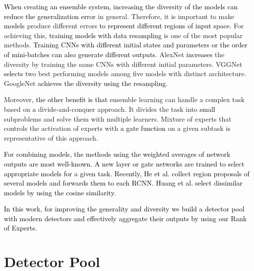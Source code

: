 \documentclass[10pt,twocolumn,letterpaper]{article}
\newcommand{\RE}{\textcolor{black}}
\newcommand{\RV}{\textcolor{black}}
\begin{document}
\RE{When creating an ensemble system,  increasing the diversity of the \RV{models}  can reduce the generalization error  \cite{Polikar_CSM06, KroghV_NIPS94}} in general. Therefore, it is important  to make \RV{models} produce different errors  \RV{to represent different regions of input space}. For achieving this, \RV{training models with data resampling} \cite{HansenS_PAMI90, KroghV_NIPS94, JacobsJNH_NC91, JordanJ_NC94} is one of the most popular methods. \RE{Training CNNs with different initial states and parameters  or the order of mini-batches can also generate different outputs}. AlexNet \cite{KrizhevskySH_NIPS12} \RV{increases} the diversity  by training the same CNNs with different initial parameters.  VGGNet \cite{SimonyanZ14a} \RV{selects} two best performing models among five models with distinct architecture. GoogleNet \cite{CVPR15_Inception} \RV{achieves the diversity using the resampling.}




Moreover, \RV{the other benefit is that} ensemble learning can handle  a complex  task based on  \RV{a} divide-and-conquer approach. It divides the task into \RV{small} subproblems and solve them with multiple learners. Mixture of experts \cite{JacobsJNH_NC91, Noam_1701}
that controls the activation of  experts with \RV{a gate function} on a given subtask is representative of this approach.






\RE{For combining models, \RV{the methods} \cite{Perrone93whennetworks, KroghV_NIPS94, JordanJ_NC94, ZhouWT_AI02} using the weighted averages  of \RV{network outputs} \RV{are} most well-known.  A new layer \cite{ParkHBB_WACV16} or gate networks \cite{LasotaLTT_ACIDS14, Noam_1701, David_ICLRW17} are trained to select appropriate models for a given task. Recently, He et al. \cite{HeZRS_CVPR16} \RV{collect} region proposals of several models and  forwards them to \RV{each RCNN}. Huang et al. \cite{HuangRSZKFFWSG_Corr16} select dissimilar models \RV{by using} the cosine similarity.} 

\RV{In this work, for improving the generality and diversity we build a detector pool with modern detectors and effectively aggregate their outputs \RV{by using} our Rank of Experts.}



\section{Detector Pool}
\label{Sec:Pool}
\end{document}
